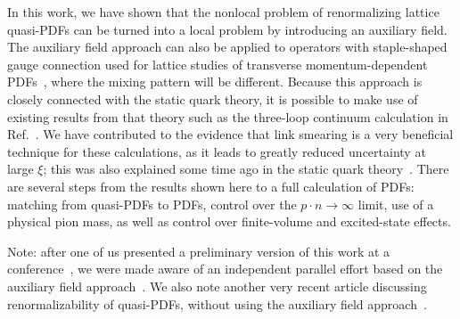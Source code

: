 In this work, we have shown that the nonlocal problem of renormalizing
lattice quasi-PDFs can be turned into a local problem by introducing
an auxiliary field. The auxiliary field approach can also be applied
to operators with staple-shaped gauge connection used for lattice
studies of transverse momentum-dependent
PDFs~\cite{Musch:2011er,Engelhardt:2015xja,Yoon:2017qzo}, where the
mixing pattern will be different. Because this approach is closely
connected with the static quark theory, it is possible to make use of
existing results from that theory such as the three-loop continuum
calculation in Ref.~\cite{Chetyrkin:2003vi}. We have contributed to
the evidence that link smearing is a very beneficial technique for
these calculations, as it leads to greatly reduced uncertainty at
large $\xi$; this was also explained some time ago in the static quark
theory~\cite{DellaMorte:2003mn}. There are several steps from the
results shown here to a full calculation of PDFs: matching from
quasi-PDFs to PDFs, control
over the $p\cdot n\to\infty$ limit, use of a physical pion mass, as
well as control over finite-volume and excited-state effects.

Note: after one of us presented a preliminary version of this work at
a conference~\cite{Green_Lat2017}, we were made aware of an
independent parallel effort based on the auxiliary field
approach~\cite{Ji:2017oey}. We also note another very recent article
discussing renormalizability of quasi-PDFs, without using the
auxiliary field approach~\cite{Ishikawa:2017faj}.
